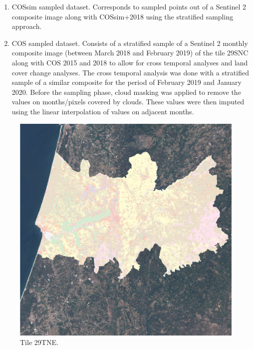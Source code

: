 \documentclass[12pt, english, openany]{book}
\begin{document}
\begin{enumerate}
        2015 to which COS 2015 was overlaid, the study area covers a region around
        Coimbra, Portugal (see Figure \ref{fig:sentinel2+cos2015}). Since the size of the
        entire tile is too large to be processed in a timely manner, a subspace of the
        image will be used. Figure \ref{fig:classifier-study-area} shows the train (top row,
        outer non-highlighted area) and test (bottom row) areas along with its true
        colour image (left column) and ground truth (right column) used to assess the
        accuracy on each classifier. As such, any pixel and/or neighbouring pixels used
        for training will never appear in the test set, making them distinct sets.
  \item COSsim sampled dataset. Corresponds to sampled points out of a Sentinel 2
        composite image along with COSsim+2018 using the stratified sampling approach.
  \item COS sampled dataset. Consists of a stratified sample of a Sentinel 2 monthly
        composite image (between March 2018 and February 2019) of the tile 29SNC along
        with COS 2015 and 2018 to allow for cross temporal analyses and land cover
        change analyses. The cross temporal analysis was done with a stratified sample
        of a similar composite for the period of February 2019 and January 2020. Before
        the sampling phase, cloud masking was applied to remove the values on
        months/pixels covered by clouds. These values were then imputed using the
        linear interpolation of values on adjacent months.
\end{enumerate}

\begin{figure}[H]
  \centering
  \includegraphics[width=.7\linewidth]{sentinel2_cos.png}
  \caption{Tile 29TNE.}
  \label{fig:sentinel2+cos2015}
\end{figure}
\end{document}
